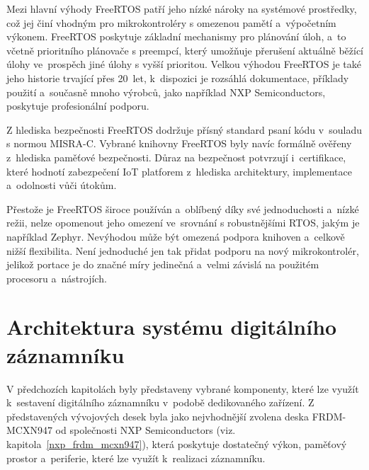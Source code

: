 Mezi hlavní výhody FreeRTOS patří jeho nízké nároky na systémové prostředky, což jej činí vhodným pro mikrokontroléry s omezenou pamětí a~výpočetním výkonem. FreeRTOS poskytuje základní mechanismy pro plánování úloh, a~to včetně prioritního plánovače s preempcí, který umožňuje přerušení aktuálně běžící úlohy ve~prospěch jiné úlohy s vyšší prioritou. Velkou výhodou FreeRTOS je také jeho historie trvající přes 20~let, k~dispozici je rozsáhlá dokumentace, příklady použití a~současně mnoho výrobců, jako například NXP Semiconductors, poskytuje profesionální podporu.~\cite{freertos_book, the_architecture_of_open_source_applications}

\newpage

Z hlediska bezpečnosti FreeRTOS dodržuje přísný standard psaní kódu v~souladu s normou MISRA-C. Vybrané knihovny FreeRTOS byly navíc formálně ověřeny z~hlediska paměťové bezpečnosti. Důraz na bezpečnost potvrzují i~certifikace, které hodnotí zabezpečení IoT platforem z~hlediska architektury, implementace a~odolnosti vůči útokům.~\cite{freertos_security}

Přestože je FreeRTOS široce používán a~oblíbený díky své jednoduchosti a~nízké režii, nelze opomenout jeho omezení ve~srovnání s robustnějšími RTOS, jakým je například Zephyr. Nevýhodou může být omezená podpora knihoven a~celkově nižší flexibilita. Není jednoduché jen tak přidat podporu na nový mikrokontrolér, jelikož portace je do značné míry jedinečná a~velmi závislá na použitém procesoru a~nástrojích.~\cite{freertos_portability, freertos_vs_zephyr}



\section{Architektura systému digitálního záznamníku}
\label{architektura_systemu_digitalniho_zaznamniku}
V předchozích kapitolách byly představeny vybrané komponenty, které lze využít k~sestavení digitálního záznamníku v~podobě dedikovaného zařízení. Z představených vývojových desek byla jako nejvhodnější zvolena deska FRDM-MCXN947 od společnosti NXP Semiconductors (viz. kapitola~\ref{nxp_frdm_mcxn947}), která poskytuje dostatečný výkon, paměťový prostor a~periferie, které lze využít k~realizaci záznamníku.


